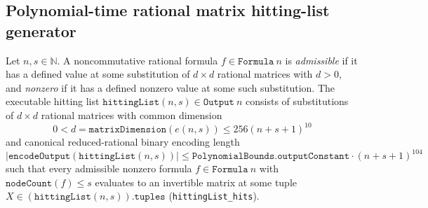 \begin{longresult}
\subsection{Polynomial-time rational matrix hitting-list generator}
Let $n,s\in\mathbb N$. A noncommutative rational formula $f\in\texttt{Formula}\ n$ is
\emph{admissible} if it has a defined value at some substitution of $d\times d$ rational matrices
with $d>0$, and \emph{nonzero} if it has a defined nonzero value at some such substitution. The
executable hitting list $\texttt{hittingList}(n,s)\in\texttt{Output}\ n$ consists of substitutions
of $d\times d$ rational matrices with common dimension
\[
0 < d = \texttt{matrixDimension}(e(n,s)) \le 256(n+s+1)^{10}
\]
and canonical reduced-rational binary encoding length
\[
|\texttt{encodeOutput}(\texttt{hittingList}(n,s))| \le
\texttt{PolynomialBounds.outputConstant}\cdot(n+s+1)^{104}
\]
such that every admissible nonzero formula $f\in\texttt{Formula}\ n$ with
$\texttt{nodeCount}(f)\le s$ evaluates to an invertible matrix at some tuple
$X\in(\texttt{hittingList}(n,s)).\texttt{tuples}$ (\texttt{hittingList\_hits}).


\end{longresult}
